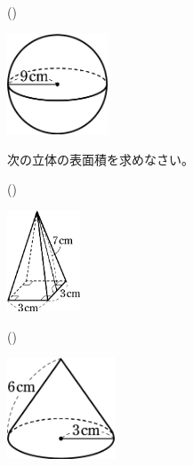 \documentclass[
  12pt,a4paper,lualatex,ja=standard]{bxjsarticle}
\begin{document}
\begin{flushleft}
\begin{multicols}{3}
\begin{center}
\end{center}

\columnbreak

()\hspace{2.5pt}

\begin{center}
\def\@captype{figure}
\includegraphics[height=30mm]{img/img12.jpg}

\end{center}

\end{multicols}

\vfill

\setcounter{skaunta}{0}
\noindent{} \hspace{1pt}次の立体の表面積を求めなさい。

\begin{multicols}{3}

()\hspace{2.5pt}

\begin{center}
\def\@captype{figure}
\includegraphics[height=30mm]{img/img13.jpg}

\end{center}

\columnbreak

()\hspace{2.5pt}

\begin{center}
\def\@captype{figure}
\includegraphics[height=30mm]{img/img11.jpg}


\end{center}
\end{multicols}
\end{flushleft}
\end{document}
